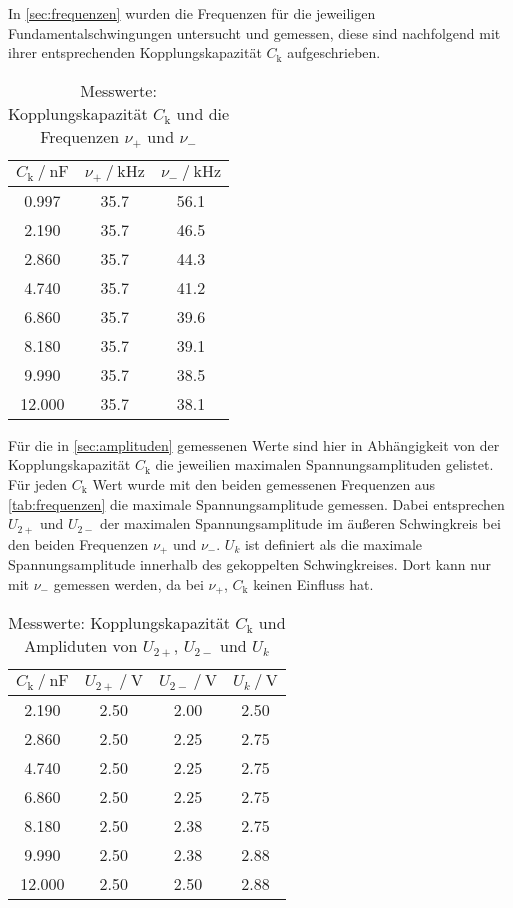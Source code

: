 In \autoref{sec:frequenzen} wurden die Frequenzen für die jeweiligen Fundamentalschwingungen untersucht und gemessen, diese sind nachfolgend mit ihrer entsprechenden Kopplungskapazität $C_\text{k}$ aufgeschrieben.

\begin{table}
  \centering
  \caption{Messwerte: Kopplungskapazität $C_\text{k}$ und die Frequenzen $\nu _+$ und $\nu _-$}
  \label{tab:frequenzen}
  \begin{tabular}{c c c}
    \toprule 
    $C_\text{k} \:/\: \si{\nano\farad}$ & $\nu _+ \:/\: \si{\kilo\hertz}$ & $\nu _- \:/\: \si{\kilo\hertz}$   \\ 
    \midrule 
    0.997 & 35.7 & 56.1 \\
    2.190 & 35.7 & 46.5 \\
    2.860 & 35.7 & 44.3 \\
    4.740 & 35.7 & 41.2 \\
    6.860 & 35.7 & 39.6 \\
    8.180 & 35.7 & 39.1 \\
    9.990 & 35.7 & 38.5 \\
    12.000 & 35.7 & 38.1 \\
    \bottomrule
  \end{tabular}
\end{table}

Für die in \autoref{sec:amplituden} gemessenen Werte sind hier in Abhängigkeit von der Kopplungskapazität $C_\text{k}$ die jeweilien maximalen Spannungsamplituden gelistet. Für jeden $C_\text{k}$ Wert wurde mit den beiden gemessenen Frequenzen aus \autoref{tab:frequenzen} die maximale Spannungsamplitude gemessen. Dabei entsprechen $U_{2+}$ und $U_{2-}$ der maximalen Spannungsamplitude im äußeren Schwingkreis bei den beiden Frequenzen $\nu _+$ und $\nu _-$. $U_k$ ist definiert als die maximale Spannungsamplitude innerhalb des gekoppelten Schwingkreises. Dort kann nur mit $\nu _-$ gemessen werden, da bei $\nu _+$, $C_\text{k}$ keinen Einfluss hat.

\begin{table}
  \centering
  \caption{Messwerte: Kopplungskapazität $C_\text{k}$ und Ampliduten von $U_{2+}$, $U_{2-}$ und $U_k$}
  \label{tab:amplituden}
  \begin{tabular}{c c c c}
    \toprule 
    $C_\text{k} \:/\: \si{\nano\farad}$ & $U_{2+} \:/\: \si{\volt}$ & $U_{2-} \:/\: \si{\volt}$ &  $U_k \:/\: \si{\volt}$       \\ 
    \midrule 
    2.190 & 2.50 & 2.00 & 2.50 \\
    2.860 & 2.50 & 2.25 & 2.75 \\
    4.740 & 2.50 & 2.25 & 2.75 \\
    6.860 & 2.50 & 2.25 & 2.75 \\
    8.180 & 2.50 & 2.38 & 2.75 \\
    9.990 & 2.50 & 2.38 & 2.88 \\
    12.000 & 2.50 & 2.50 & 2.88 \\
    \bottomrule
  \end{tabular}
\end{table}

